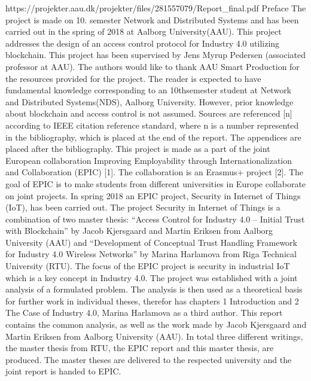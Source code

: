 https://projekter.aau.dk/projekter/files/281557079/Report_final.pdf
Preface
The project is made on 10. semester Network and Distributed Systems and has been
carried out in the spring of 2018 at Aalborg University(AAU). This project addresses
the design of an access control protocol for Industry 4.0 utilizing blockchain.
This project has been supervised by Jens Myrup Pedersen (associated professor at
AAU). The authors would like to thank AAU Smart Production for the resources
provided for the project.
The reader is expected to have fundamental knowledge corresponding to an 10thsemester student at Network and Distributed Systems(NDS), Aalborg University.
However, prior knowledge about blockchain and access control is not assumed.
Sources are referenced [n] according to IEEE citation reference standard, where n is
a number represented in the bibliography, which is placed at the end of the report.
The appendices are placed after the bibliography.
This project is made as a part of the joint European collaboration Improving
Employability through Internationalization and Collaboration (EPIC) [1]. The
collaboration is an Erasmus+ project [2]. The goal of EPIC is to make students from
different universities in Europe collaborate on joint projects. In spring 2018 an EPIC
project, Security in Internet of Things (IoT), has been carried out.
The project Security in Internet of Things is a combination of two master thesis:
“Access Control for Industry 4.0 – Initial Trust with Blockchain” by Jacob Kjersgaard
and Martin Eriksen from Aalborg University (AAU) and “Development of Conceptual
Trust Handling Framework for Industry 4.0 Wireless Networks” by Marina
Harlamova from Riga Technical University (RTU). The focus of the EPIC project is
security in industrial IoT which is a key concept in Industry 4.0. The project was
established with a joint analysis of a formulated problem. The analysis is then used
as a theoretical basis for further work in individual theses, therefor has chapters 1
Introduction and 2 The Case of Industry 4.0, Marina Harlamova as a third author.
This report contains the common analysis, as well as the work made by Jacob
Kjersgaard and Martin Eriksen from Aalborg University (AAU).
In total three different writings, the master thesis from RTU, the EPIC report and
this master thesis, are produced. The master theses are delivered to the respected
university and the joint report is handed to EPIC.